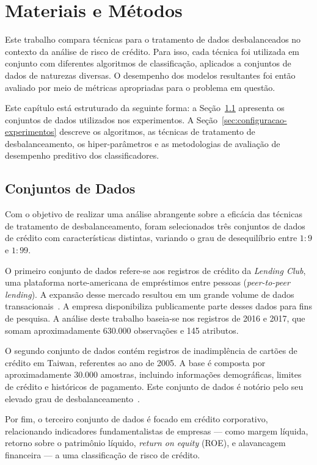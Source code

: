 \chapter{Materiais e Métodos}\label{cap:ferramentas}

Este trabalho compara técnicas para o tratamento de dados desbalanceados no contexto da análise de risco de crédito. Para isso, cada técnica foi utilizada em conjunto com diferentes algoritmos de classificação, aplicados a conjuntos de dados de naturezas diversas. O desempenho dos modelos resultantes foi então avaliado por meio de métricas apropriadas para o problema em questão.

Este capítulo está estruturado da seguinte forma: a Seção~\ref{sec:datasets} apresenta os conjuntos de dados utilizados nos experimentos. A Seção~\ref{sec:configuracao-experimentos} descreve os algoritmos, as técnicas de tratamento de desbalanceamento, os hiper-parâmetros e as metodologias de avaliação de desempenho preditivo dos classificadores.

\section{Conjuntos de Dados}\label{sec:datasets}

Com o objetivo de realizar uma análise abrangente sobre a eficácia das técnicas de tratamento de desbalanceamento, foram selecionados três conjuntos de dados de crédito com características distintas, variando o grau de desequilíbrio entre \(1:9\) e \(1:99\).

O primeiro conjunto de dados refere-se aos registros de crédito da \textit{Lending Club}, uma plataforma norte-americana de empréstimos entre pessoas (\textit{peer-to-peer lending}). A expansão desse mercado resultou em um grande volume de dados transacionais~\cite{Namvar2018}. A empresa disponibiliza publicamente parte desses dados para fins de pesquisa. A análise deste trabalho baseia-se nos registros de 2016 e 2017, que somam aproximadamente \(630.000\) observações e 145 atributos.

O segundo conjunto de dados contém registros de inadimplência de cartões de crédito em Taiwan, referentes ao ano de 2005. A base é composta por aproximadamente 30.000 amostras, incluindo informações demográficas, limites de crédito e históricos de pagamento. Este conjunto de dados é notório pelo seu elevado grau de desbalanceamento~\cite{Wei2025}.

Por fim, o terceiro conjunto de dados é focado em crédito corporativo, relacionando indicadores fundamentalistas de empresas — como margem líquida, retorno sobre o patrimônio líquido, \textit{return on equity} (ROE), e alavancagem financeira — a uma classificação de risco de crédito.


